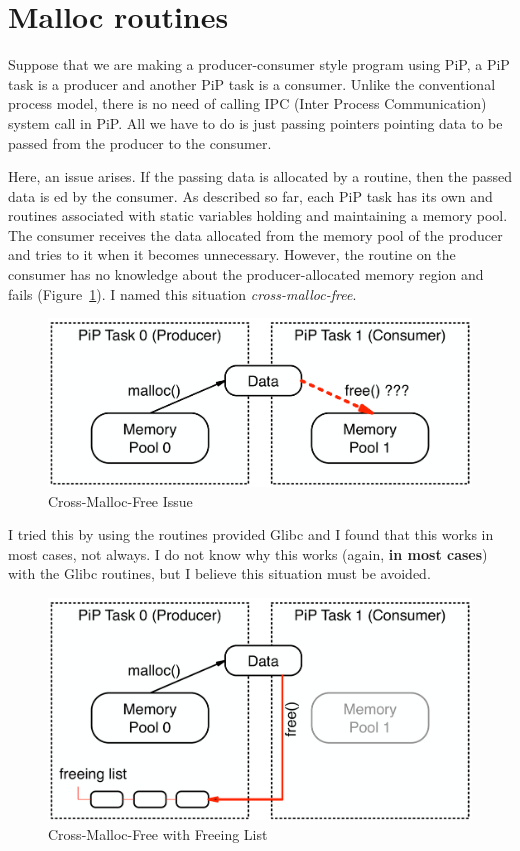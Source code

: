 
\section{Malloc routines}\label{sec:malloc}

Suppose that we are making a producer-consumer style program using PiP,
a PiP task is a producer and another PiP task is a consumer. Unlike the
conventional process model, there is no need of calling IPC (Inter
Process Communication) system call in PiP. All we have to do is just
passing pointers pointing data to be passed from the producer to the
consumer.

Here, an issue arises. If the passing data is allocated by a
 routine, then the passed data is
ed by the consumer. As described so far, each PiP
task has its own  and  routines
associated with static variables holding and maintaining a memory
pool. The consumer receives 
the data allocated from the memory pool of the producer and tries to
 it when it becomes unnecessary. However, the
 routine on the consumer has no knowledge about the
producer-allocated memory region and fails
(Figure~\ref{fig:cross-malloc-free-issue}). I 
named this situation {\it cross-malloc-free}. 

\begin{figure}[ht]
\centering
\includegraphics[width=0.7\columnwidth]{malloc/Figs/ProducerConsumer.pdf}
\caption{Cross-Malloc-Free Issue}
\label{fig:cross-malloc-free-issue}
\end{figure}

I tried this by using the  routines provided Glibc and I
found that this works in most cases, not always. I do not know why
this works (again, {\bf in most cases}) with the Glibc 
routines, but I believe this situation must be avoided.

\begin{figure}[ht]
\centering
\includegraphics[width=0.7\columnwidth]{malloc/Figs/CrossMallocFree.pdf}
\caption{Cross-Malloc-Free with Freeing List}
\label{fig:cross-malloc-free}
\end{figure}

